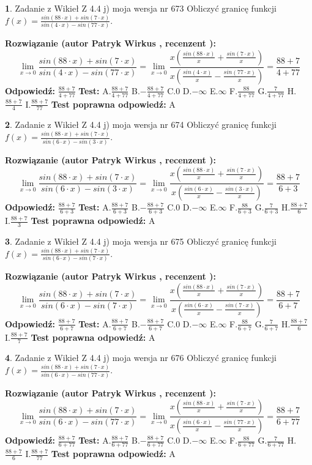 \documentclass[12pt, a4paper]{article}
\theoremstyle{definition} %
\newtheorem{zad}{}
\newcommand{\zadStart}[1]{\begin{zad}#1\newline}
\newcommand{\zadStop}{\end{zad}}
\newcommand{\rozwStart}[2]{\noindent \textbf{Rozwiązanie (autor #1 , recenzent #2): }\newline}
\newcommand{\rozwStop}{\newline}
\newcommand{\odpStart}{\noindent \textbf{Odpowiedź:}\newline}
\newcommand{\odpStop}{\newline}
\newcommand{\testStart}{\noindent \textbf{Test:}\newline}
\newcommand{\testStop}{\newline}
\newcommand{\kluczStart}{\noindent \textbf{Test poprawna odpowiedź:}\newline}
\newcommand{\kluczStop}{\newline}
\begin{document}
\zadStart{Zadanie z Wikieł Z 4.4 j) moja wersja nr 673}
Obliczyć granicę funkcji $f(x)=\frac{sin(88\cdot x) +sin(7\cdot x)}{sin(4\cdot x) -sin(77\cdot x)}$.
\zadStop
\rozwStart{Patryk Wirkus}{}
$$\lim\limits_{x\to 0}\frac{sin(88\cdot x) +sin(7\cdot x)}{sin(4\cdot x) -sin(77\cdot x)}=\lim\limits_{x\to 0}\frac{x(\frac{sin(88\cdot x)}{x}+\frac{sin(7\cdot x)}{x})}{x(\frac{sin(4\cdot x)}{x}-\frac{sin(77\cdot x)}{x})}=\frac{88+7}{4+77}$$
\rozwStop
\odpStart
$\frac{88+7}{4+77}$
\odpStop
\testStart
A.$\frac{88+7}{4+77}$
B.$-\frac{88+7}{4+77}$
C.$0$
D.$-\infty$
E.$\infty$
F.$\frac{88}{4+77}$
G.$\frac{7}{4+77}$
H.$\frac{88+7}{4}$
I.$\frac{88+7}{77}$
\testStop
\kluczStart
A
\kluczStop



\zadStart{Zadanie z Wikieł Z 4.4 j) moja wersja nr 674}
Obliczyć granicę funkcji $f(x)=\frac{sin(88\cdot x) +sin(7\cdot x)}{sin(6\cdot x) -sin(3\cdot x)}$.
\zadStop
\rozwStart{Patryk Wirkus}{}
$$\lim\limits_{x\to 0}\frac{sin(88\cdot x) +sin(7\cdot x)}{sin(6\cdot x) -sin(3\cdot x)}=\lim\limits_{x\to 0}\frac{x(\frac{sin(88\cdot x)}{x}+\frac{sin(7\cdot x)}{x})}{x(\frac{sin(6\cdot x)}{x}-\frac{sin(3\cdot x)}{x})}=\frac{88+7}{6+3}$$
\rozwStop
\odpStart
$\frac{88+7}{6+3}$
\odpStop
\testStart
A.$\frac{88+7}{6+3}$
B.$-\frac{88+7}{6+3}$
C.$0$
D.$-\infty$
E.$\infty$
F.$\frac{88}{6+3}$
G.$\frac{7}{6+3}$
H.$\frac{88+7}{6}$
I.$\frac{88+7}{3}$
\testStop
\kluczStart
A
\kluczStop



\zadStart{Zadanie z Wikieł Z 4.4 j) moja wersja nr 675}
Obliczyć granicę funkcji $f(x)=\frac{sin(88\cdot x) +sin(7\cdot x)}{sin(6\cdot x) -sin(7\cdot x)}$.
\zadStop
\rozwStart{Patryk Wirkus}{}
$$\lim\limits_{x\to 0}\frac{sin(88\cdot x) +sin(7\cdot x)}{sin(6\cdot x) -sin(7\cdot x)}=\lim\limits_{x\to 0}\frac{x(\frac{sin(88\cdot x)}{x}+\frac{sin(7\cdot x)}{x})}{x(\frac{sin(6\cdot x)}{x}-\frac{sin(7\cdot x)}{x})}=\frac{88+7}{6+7}$$
\rozwStop
\odpStart
$\frac{88+7}{6+7}$
\odpStop
\testStart
A.$\frac{88+7}{6+7}$
B.$-\frac{88+7}{6+7}$
C.$0$
D.$-\infty$
E.$\infty$
F.$\frac{88}{6+7}$
G.$\frac{7}{6+7}$
H.$\frac{88+7}{6}$
I.$\frac{88+7}{7}$
\testStop
\kluczStart
A
\kluczStop



\zadStart{Zadanie z Wikieł Z 4.4 j) moja wersja nr 676}
Obliczyć granicę funkcji $f(x)=\frac{sin(88\cdot x) +sin(7\cdot x)}{sin(6\cdot x) -sin(77\cdot x)}$.
\zadStop
\rozwStart{Patryk Wirkus}{}
$$\lim\limits_{x\to 0}\frac{sin(88\cdot x) +sin(7\cdot x)}{sin(6\cdot x) -sin(77\cdot x)}=\lim\limits_{x\to 0}\frac{x(\frac{sin(88\cdot x)}{x}+\frac{sin(7\cdot x)}{x})}{x(\frac{sin(6\cdot x)}{x}-\frac{sin(77\cdot x)}{x})}=\frac{88+7}{6+77}$$
\rozwStop
\odpStart
$\frac{88+7}{6+77}$
\odpStop
\testStart
A.$\frac{88+7}{6+77}$
B.$-\frac{88+7}{6+77}$
C.$0$
D.$-\infty$
E.$\infty$
F.$\frac{88}{6+77}$
G.$\frac{7}{6+77}$
H.$\frac{88+7}{6}$
I.$\frac{88+7}{77}$
\testStop
\kluczStart
A
\kluczStop
\end{document}
